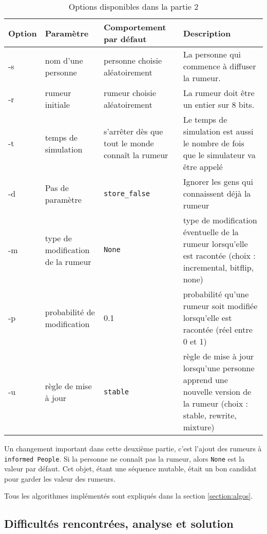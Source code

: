 \documentclass[11pt,a4paper]{article}
\begin{document}
\begin{table}[ht]
\begin{adjustwidth}{-16em}{-16em}
\centering
\begin{tabular}{|p{2cm}|p{4cm}|p{3cm}|p{6cm}|}
\hline
 Option & Paramètre & Comportement par défaut & Description \\ \hline \hline
 -s & nom d'une personne & personne choisie aléatoirement & La personne qui commence à diffuser la rumeur.\\ \hline
 -r & rumeur initiale & rumeur choisie aléatoirement & La rumeur doit être un entier sur 8 bits.\\ \hline
 -t & temps de simulation & s’arrêter dès que tout le monde connaît la rumeur &
 Le temps de simulation est aussi le nombre de fois que le simulateur va être appelé\\ \hline
 -d & Pas de paramètre & \texttt{store\_false} & Ignorer les gens qui connaissent déjà la rumeur\\ \hline
 -m & type de modification de la rumeur & \texttt{None} & type de modification éventuelle de la rumeur lorsqu’elle est racontée (choix : incremental, bitflip, none)\\ \hline
 -p & probabilité de modification & 0.1 & probabilité qu’une rumeur soit modifiée lorsqu’elle est racontée (réel entre 0 et 1)\\ \hline
 -u & règle de mise à jour & \texttt{stable} & règle de mise à jour lorsqu’une personne apprend une nouvelle version de la rumeur (choix : stable, rewrite, mixture)\\ \hline
\end{tabular}
\end{adjustwidth}
\caption{Options disponibles dans la partie 2}
\label{tab:options}
\end{table}

Un changement important dans cette deuxième partie, c'est l'ajout des rumeurs à \texttt{informed People}. Si la personne ne connaît pas la rumeur, alors \texttt{None} est la valeur par défaut. Cet objet, étant une séquence mutable, était un bon candidat pour garder les valeur des rumeurs.

Tous les algorithmes implémentés sont expliqués dans la section \ref{section:algos}.

\subsection{Difficultés rencontrées, analyse et solution}
\end{document}
